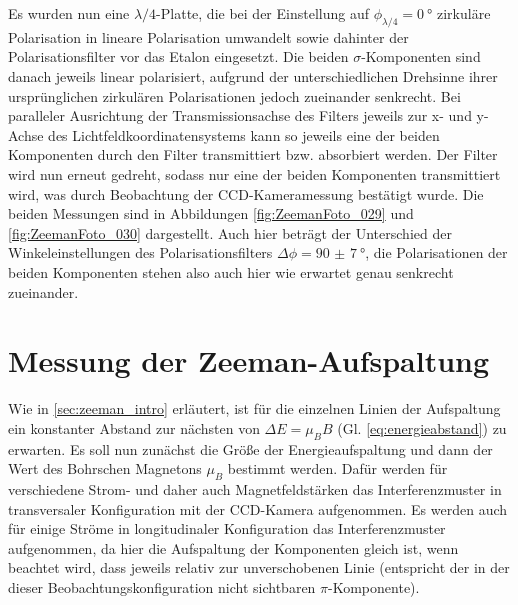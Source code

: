 
Es wurden nun eine $\lambda/4$-Platte, die bei der Einstellung auf $\phi_{\lambda/4}=\SI{0}{\degree}$ zirkuläre Polarisation in lineare Polarisation umwandelt \cite[238-239]{Demtroeder2} sowie dahinter der Polarisationsfilter vor das Etalon eingesetzt. Die beiden $\sigma$-Komponenten sind danach jeweils linear polarisiert, aufgrund der unterschiedlichen Drehsinne ihrer ursprünglichen zirkulären Polarisationen jedoch zueinander senkrecht. Bei paralleler Ausrichtung der Transmissionsachse des Filters jeweils zur x- und y-Achse des Lichtfeldkoordinatensystems kann so jeweils eine der beiden Komponenten durch den Filter transmittiert bzw. absorbiert werden. Der Filter wird nun erneut gedreht, sodass nur eine der beiden Komponenten transmittiert wird, was durch Beobachtung der CCD-Kameramessung bestätigt wurde. Die beiden Messungen sind in Abbildungen \ref{fig:ZeemanFoto_029} und \ref{fig:ZeemanFoto_030} dargestellt. Auch hier beträgt der Unterschied der Winkeleinstellungen des Polarisationsfilters $\Delta \phi = \SI{90(7)}{\degree}$, die Polarisationen der beiden Komponenten stehen also auch hier wie erwartet genau senkrecht zueinander.



\section{Messung der Zeeman-Aufspaltung}

Wie in \ref{sec:zeeman_intro} erläutert, ist für die einzelnen Linien der Aufspaltung ein konstanter Abstand zur nächsten von $\Delta E = \mu_B B$ (Gl. \ref{eq:energieabstand}) zu erwarten.
Es soll nun zunächst die Größe der Energieaufspaltung und dann der Wert des Bohrschen Magnetons $\mu_B$ bestimmt werden. Dafür werden für verschiedene Strom- und daher auch Magnetfeldstärken das Interferenzmuster in transversaler Konfiguration mit der CCD-Kamera aufgenommen. Es werden auch für einige Ströme in longitudinaler Konfiguration das Interferenzmuster aufgenommen, da hier die Aufspaltung der Komponenten gleich ist, wenn beachtet wird, dass jeweils relativ zur unverschobenen Linie (entspricht der in der dieser Beobachtungskonfiguration nicht sichtbaren $\pi$-Komponente).

